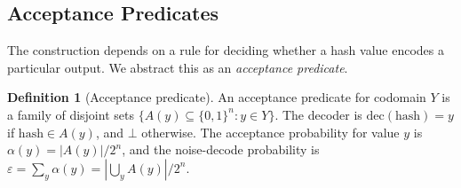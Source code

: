 \documentclass[11pt]{article}
\theoremstyle{definition}
\newtheorem{definition}{Definition}[section]
\theoremstyle{plain}
\theoremstyle{remark}
\newcommand{\dec}{\mathrm{dec}}
\begin{document}
\subsection{Acceptance Predicates}
\label{subsec:acceptance}

The construction depends on a rule for deciding whether a hash value
encodes a particular output.  We abstract this as an \emph{acceptance
predicate}.

\begin{definition}[Acceptance predicate]
\label{def:acceptance}
An acceptance predicate for codomain $Y$ is a family of disjoint sets
$\{A(y) \subseteq \{0,1\}^n : y \in Y\}$.  The decoder is
$\dec(\text{hash}) = y$ if $\text{hash} \in A(y)$, and $\bot$ otherwise.
The acceptance probability for value $y$ is $\alpha(y) = |A(y)| / 2^n$,
and the noise-decode probability is
$\varepsilon = \sum_y \alpha(y) = |\bigcup_y A(y)| / 2^n$.
\end{definition}
\end{document}
